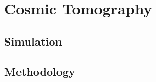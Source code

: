 \documentclass[12pt,a4paper]{article}
\begin{document}
\section{Cosmic Tomography}\label{sec_cosmicTomography}
\subsection{Simulation}\label{subSec_cosmicTomography_simulation}
\subsection{Methodology}\label{subSec_cosmicTomography_methodology}

% 
%
\printbibliography
\end{document}
